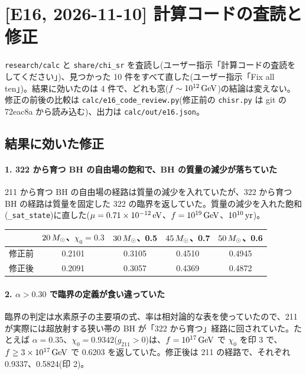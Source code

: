 \section{[E16, 2026-11-10] 計算コードの査読と修正}\label{sec:e16}

\texttt{research/calc} と \texttt{share/chi\_sr} を査読し(ユーザー指示「計算コードの査読をしてください」)、見つかった 10 件をすべて直した(ユーザー指示「Fix all ten」)。結果に効いたのは 4 件で、どれも窓($f\sim10^{12}\,\mathrm{GeV}$)の結論は変えない。修正の前後の比較は \texttt{calc/e16\_code\_review.py}(修正前の \texttt{chisr.py} は git の 72eac8a から読み込む)、出力は \texttt{calc/out/e16.json}。

\subsection{結果に効いた修正}

\paragraph{1. 322 から育つ BH の自由場の飽和で、BH の質量の減少が落ちていた}
211 から育つ BH の自由場の経路は質量の減少を入れていたが、322 から育つ BH の経路は質量を固定した 322 の臨界を返していた。質量の減少を入れた飽和(\texttt{\_sat\_state})に直した($\mu=0.71\times10^{-12}\,\mathrm{eV}$、$f=10^{19}\,\mathrm{GeV}$、$10^{10}\,\mathrm{yr}$)。
\begin{center}\small
\begin{tabular}{rcccc}
\toprule
 & $20\,M_\odot$、$\chi_0=0.3$ & $30\,M_\odot$、0.5 & $45\,M_\odot$、0.7 & $50\,M_\odot$、0.6\\
\midrule
修正前 & 0.2101 & 0.3105 & 0.4510 & 0.4945\\
修正後 & 0.2091 & 0.3057 & 0.4369 & 0.4872\\
\bottomrule
\end{tabular}
\end{center}

\paragraph{2. $\alpha>0.30$ で臨界の定義が食い違っていた}
臨界の判定は水素原子の主要項の式、率は相対論的な表を使っていたので、211 が実際には超放射する狭い帯の BH が「322 から育つ」経路に回されていた。たとえば $\alpha=0.35$、$\chi_0=0.9342$($g_{211}>0$)は、$f=10^{17}\,\mathrm{GeV}$ で $\chi_0$ を印 3 で、$f\ge3\times10^{17}\,\mathrm{GeV}$ で 0.6203 を返していた。修正後は 211 の経路で、それぞれ 0.9337、0.5824(印 2)。

